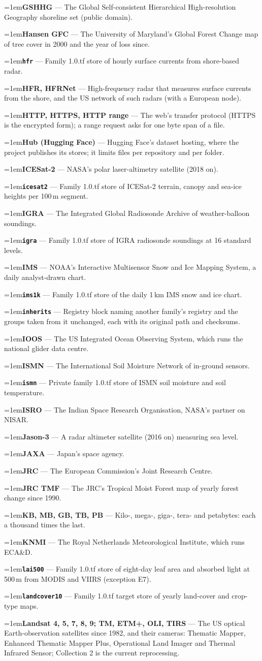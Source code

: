 \documentclass[10pt]{article}
\newcommand{\code}[1]{\texttt{#1}}
\newcommand{\gl}[2]{\par\hangindent=1em\hangafter=1\textbf{#1} --- #2\par}
\begin{document}
\gl{GSHHG}{The Global Self-consistent Hierarchical High-resolution Geography shoreline set (public domain).}
\gl{Hansen GFC}{The University of Maryland's Global Forest Change map of tree cover in 2000 and the year of loss since.}
\gl{\code{hfr}}{Family 1.0.tf store of hourly surface currents from shore-based radar.}
\gl{HFR, HFRNet}{High-frequency radar that measures surface currents from the shore, and the US network of such radars (with a European node).}
\gl{HTTP, HTTPS, HTTP range}{The web's transfer protocol (HTTPS is the encrypted form); a range request asks for one byte span of a file.}
\gl{Hub (Hugging Face)}{Hugging Face's dataset hosting, where the project publishes its stores; it limits files per repository and per folder.}
\gl{ICESat-2}{NASA's polar laser-altimetry satellite (2018 on).}
\gl{\code{icesat2}}{Family 1.0.tf store of ICESat-2 terrain, canopy and sea-ice heights per 100\,m segment.}
\gl{IGRA}{The Integrated Global Radiosonde Archive of weather-balloon soundings.}
\gl{\code{igra}}{Family 1.0.tf store of IGRA radiosonde soundings at 16 standard levels.}
\gl{IMS}{NOAA's Interactive Multisensor Snow and Ice Mapping System, a daily analyst-drawn chart.}
\gl{\code{ims1k}}{Family 1.0.tf store of the daily 1\,km IMS snow and ice chart.}
\gl{\code{inherits}}{Registry block naming another family's registry and the groups taken from it unchanged, each with its original path and checksums.}
\gl{IOOS}{The US Integrated Ocean Observing System, which runs the national glider data centre.}
\gl{ISMN}{The International Soil Moisture Network of in-ground sensors.}
\gl{\code{ismn}}{Private family 1.0.tf store of ISMN soil moisture and soil temperature.}
\gl{ISRO}{The Indian Space Research Organisation, NASA's partner on NISAR.}
\gl{Jason-3}{A radar altimeter satellite (2016 on) measuring sea level.}
\gl{JAXA}{Japan's space agency.}
\gl{JRC}{The European Commission's Joint Research Centre.}
\gl{JRC TMF}{The JRC's Tropical Moist Forest map of yearly forest change since 1990.}
\gl{KB, MB, GB, TB, PB}{Kilo-, mega-, giga-, tera- and petabytes: each a thousand times the last.}
\gl{KNMI}{The Royal Netherlands Meteorological Institute, which runs ECA\&D.}
\gl{\code{lai500}}{Family 1.0.tf store of eight-day leaf area and absorbed light at 500\,m from MODIS and VIIRS (exception E7).}
\gl{\code{landcover10}}{Family 1.0.tf target store of yearly land-cover and crop-type maps.}
\gl{Landsat 4, 5, 7, 8, 9; TM, ETM+, OLI, TIRS}{The US optical Earth-observation satellites since 1982, and their cameras: Thematic Mapper, Enhanced Thematic Mapper Plus, Operational Land Imager and Thermal Infrared Sensor; Collection 2 is the current reprocessing.}
\end{document}
